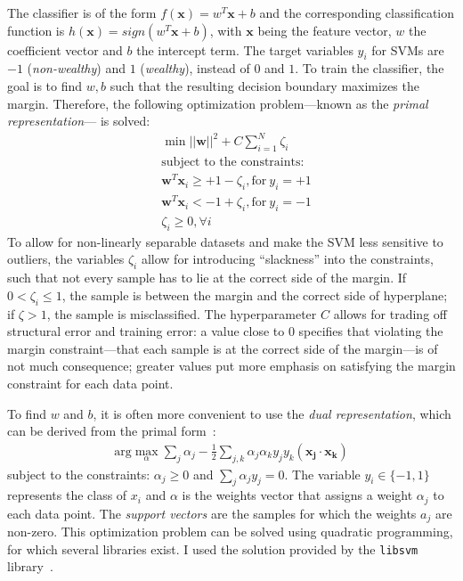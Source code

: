 \documentclass[a4paper,11pt]{article}
\begin{document}
The classifier is of the form $f(\mathbf{x}) = w^T\mathbf{x} + b$ and
the corresponding classification function is
$h(\mathbf{x}) = sign(w^T\mathbf{x} + b)$, with $\mathbf{x}$ being the
feature vector, $w$ the coefficient vector and $b$ the intercept
term. The target variables $y_i$ for SVMs are $-1$ (\emph{non-wealthy})
and $1$ (\emph{wealthy}), instead of $0$ and $1$. To train the
classifier, the goal is to find $w, b$ such that the resulting
decision boundary maximizes the margin.
Therefore, the following optimization problem---known as the
\emph{primal representation}--- is solved:
\begin{align}
  & \min ||\mathbf{w}||^2 + C \sum_{i = 1}^N\zeta_i\\
  & \text{subject to the constraints:}\\
 & \mathbf{w}^T\mathbf{x}_i \geq + 1-\zeta_i, \text{for}~y_i =
  +1\\
 & \mathbf{w}^T\mathbf{x}_i <-1+\zeta_i, \text{for}~y_i =
  -1\\
& \zeta_i \geq 0, \forall i
\end{align}
To allow for non-linearly separable datasets and make the SVM less
sensitive to outliers, the variables $\zeta_i$ allow for introducing
``slackness'' into the constraints, such that not every sample has to
lie at the correct side of the margin. If $0 < \zeta_i \leq 1$, the
sample is between the margin and the correct side of hyperplane; if
$\zeta > 1$, the sample is misclassified. The hyperparameter $C$
allows for trading off structural error and training error: a value
close to 0 specifies that violating the margin constraint---that each
sample is at the correct side of the margin---is of not much
consequence; greater values put more emphasis on satisfying the margin
constraint for each data point.


To find $w$ and $b$, it is often more convenient to use the \emph{dual
  representation}, which can be derived from the primal
form~\cite{russell2003artificial}:
\begin{align}
\label{eq:dual}
\text{arg}\max_\alpha\sum_j\alpha_j - \frac{1}{2}\sum_{j,k}\alpha_j\alpha_ky_jy_k(\mathbf{x_j} \cdot \mathbf{x_k})
\end{align} subject to the constraints: $\alpha_j \geq 0$ and
$\sum_j\alpha_jy_j=0$. The variable $y_i \in \{-1, 1\}$ represents the
class of $x_i$ and $\alpha$ is the weights vector that assigns a weight
$\alpha_j$ to each data point. The \emph{support vectors} are the
samples for which the weights $a_j$ are non-zero. 
This optimization problem can be solved using
quadratic programming, for which several libraries
exist. I used the solution provided by the \texttt{libsvm}
library~\cite{libsvm2011}.
\end{document}
